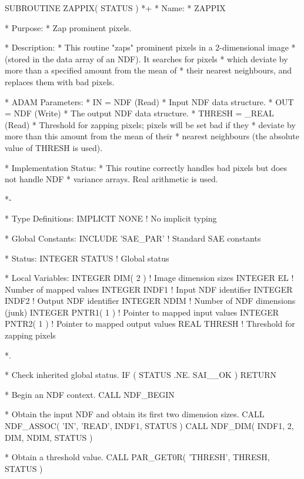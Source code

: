 \documentclass[twoside,11pt,nolof]{starlink}
\begin{document}
\small
\begin{terminalv}
      SUBROUTINE ZAPPIX( STATUS )
*+
*  Name:
*     ZAPPIX

*  Purpose:
*     Zap prominent pixels.

*  Description:
*     This routine "zaps" prominent pixels in a 2-dimensional image
*     (stored in the data array of an NDF). It searches for pixels
*     which deviate by more than a specified amount from the mean of
*     their nearest neighbours, and replaces them with bad pixels.

*  ADAM Parameters:
*     IN = NDF (Read)
*        Input NDF data structure.
*     OUT = NDF (Write)
*        The output NDF data structure.
*     THRESH = _REAL (Read)
*        Threshold for zapping pixels; pixels will be set bad if they
*        deviate by more than this amount from the mean of their
*        nearest neighbours (the absolute value of THRESH is used).

*  Implementation Status:
*     This routine correctly handles bad pixels but does not handle NDF
*     variance arrays. Real arithmetic is used.

*-

*  Type Definitions:
      IMPLICIT NONE              ! No implicit typing

*  Global Constants:
      INCLUDE 'SAE_PAR'          ! Standard SAE constants

*  Status:
      INTEGER STATUS             ! Global status

*  Local Variables:
      INTEGER DIM( 2 )           ! Image dimension sizes
      INTEGER EL                 ! Number of mapped values
      INTEGER INDF1              ! Input NDF identifier
      INTEGER INDF2              ! Output NDF identifier
      INTEGER NDIM               ! Number of NDF dimensions (junk)
      INTEGER PNTR1( 1 )         ! Pointer to mapped input values
      INTEGER PNTR2( 1 )         ! Pointer to mapped output values
      REAL THRESH                ! Threshold for zapping pixels

*.

*  Check inherited global status.
      IF ( STATUS .NE. SAI__OK ) RETURN

*  Begin an NDF context.
      CALL NDF_BEGIN

*  Obtain the input NDF and obtain its first two dimension sizes.
      CALL NDF_ASSOC( 'IN', 'READ', INDF1, STATUS )
      CALL NDF_DIM( INDF1, 2, DIM, NDIM, STATUS )

*  Obtain a threshold value.
      CALL PAR_GET0R( 'THRESH', THRESH, STATUS )


\end{terminalv}
\end{document}
